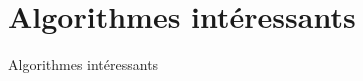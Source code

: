 \section{Algorithmes intéressants}

\textcolor{cardinal}{Algorithmes intéressants}

  
    
   
  
  
\bigskip
